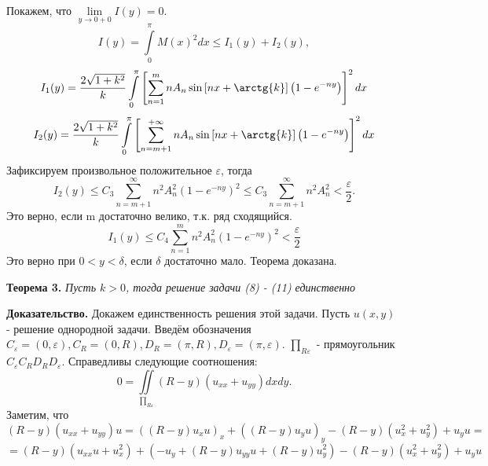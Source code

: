 \documentclass[9pt]{article}
\begin{document}
	Покажем, что $\lim\limits_{y \to 0 + 0} I(y) = 0$.
	\begin{equation*}
		I(y)  = \int\limits_0^\pi M(x)^2 dx \leq I_1(y) + I_2(y),
	\end{equation*}
	\begin{equation*}
		I_1(y) = \dfrac{2\sqrt{1 + k^2}}{k} \int\limits_0^\pi\left[\sum\limits_{n=1}^{m} n A_n \sin{\left[nx + \arctg{k}\right]} \left(1 - e^{-ny}\right)\right]^2 dx
	\end{equation*}
	\begin{equation*}
		I_2(y) = \dfrac{2\sqrt{1 + k^2}}{k} \int\limits_0^\pi\left[\sum\limits_{n=m+1}^{+\infty} n A_n \sin{\left[nx + \arctg{k}\right]} \left(1 - e^{-ny}\right)\right]^2 dx
	\end{equation*}
	Зафиксируем произвольное положительное $\varepsilon$, тогда
	\begin{equation*}
		I_2(y) \leq C_3 \sum\limits_{n=m+1}^{\infty} n^2 A_n^2 (1 - e^{-ny})^2 \leq C_3 \sum\limits_{n=m+1}^{\infty} n^2 A_n^2 < \dfrac{\varepsilon}{2}.
	\end{equation*}
	Это верно, если m достаточно велико, т.к. ряд сходящийся.
	\begin{equation*}
		I_1(y) \leq C_4 \sum\limits_{n=1}^{m} n^2 A_n^2 (1 - e^{-ny})^2 < \dfrac{\varepsilon}{2}
	\end{equation*}
	Это верно при $0 < y < \delta$, если $\delta$ достаточно мало. Теорема доказана.
	\par
\textbf{Теорема 3.} \textit{Пусть $k > 0$, тогда решение задачи (8) - (11) единственно}
\par
\textbf{Доказательство.} Докажем единственность решения этой задачи. Пусть $u(x,y)$ - решение однородной задачи.
Введём обозначения $C_\varepsilon = (0, \varepsilon), C_R = (0, R), D_R = (\pi, R), D_\varepsilon = (\pi, \varepsilon)$. $\prod_{R\varepsilon}$ - прямоугольник $C_\varepsilon C_R D_R D_\varepsilon$. Справедливы следующие соотношения:
\begin{equation*}
	0 = \iint\limits_{\prod_{R\varepsilon}} (R-y) (u_{xx} + u_{yy}) dx dy.
\end{equation*}
Заметим, что
\begin{equation*}
	(R - y) (u_{xx} + u_{yy}) u = \left( \left(R - y\right) u_x u\right)_x  + \left( \left(R - y\right) u_y u\right)_y - \left(R- y\right) \left(u_x^2 + u_y^2\right) +  u_y u = 
\end{equation*}
\begin{equation*}
	= \left(R-y\right) \left(u_{xx} u + u_x^2\right) + \left(-u_y + \left(R-y\right) u_{yy} u + \left(R-y\right)u_y^2\right) - \left(R- y\right) \left(u_x^2 + u_y^2\right)+  u_y u
\end{equation*}
\end{document}
